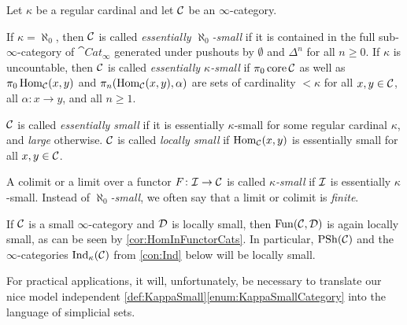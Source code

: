 \begin{defi}\label{def:KappaSmall}
	Let $\kappa$ be a regular cardinal and let $\mathcal{C}$ be an $\infty$-category.
	\begin{alphanumerate}
		\item If $\kappa=\aleph_0$, then $\mathcal{C}$ is called \emph{essentially $\aleph_0$-small} if it is contained in the full sub-$\infty$-category of $\cat{Cat}_\infty$ generated under pushouts by $\emptyset$ and $\Delta^n$ for all $n\geqslant 0$. If $\kappa$ is uncountable, then $\mathcal{C}$ is called \emph{essentially $\kappa$-small} if $\pi_0\operatorname{core} \mathcal{C}$ as well as $\pi_0\operatorname{Hom}_{\mathcal{C}}(x,y)$ and $\pi_n(\operatorname{Hom}_{\mathcal{C}}(x,y),\alpha)$ are sets of cardinality $<\kappa$ for all $x,y\in\mathcal{C}$, all $\alpha\colon x\rightarrow y$, and all $n\geqslant 1$.\label{enum:KappaSmallCategory}%
		\item $\mathcal{C}$ is called \emph{essentially small} if it is essentially $\kappa$-small for some regular cardinal $\kappa$, and \emph{large} otherwise. $\mathcal{C}$ is called \emph{locally small} if $\operatorname{Hom}_{\mathcal{C}}(x,y)$ is essentially small for all $x,y\in\mathcal{C}$.\label{enum:Small}
		\item A colimit or a limit over a functor $F\colon \mathcal{I}\rightarrow \mathcal{C}$ is called \emph{$\kappa$-small} if $\mathcal{I}$ is essentially $\kappa$-small. Instead of \emph{$\aleph_0$-small}, we often say that a limit or colimit is \emph{finite}.\label{enum:KappaSmallLimit}
	\end{alphanumerate}
\end{defi}
\begin{rem}\label{rem:FunLocallySmall}
	If $\mathcal{C}$ is a small $\infty$-category and $\mathcal{D}$ is locally small, then $\operatorname{Fun}(\mathcal{C},\mathcal{D})$ is again locally small, as can be seen by \cref{cor:HomInFunctorCats}. In particular, $\operatorname{PSh}(\mathcal{C})$ and the $\infty$-categories $\mathrm{Ind}_\kappa(\mathcal{C})$ from \cref{con:Ind} below will be locally small.
\end{rem}
For practical applications, it will, unfortunately, be necessary to translate our nice model independent \cref{def:KappaSmall}\cref{enum:KappaSmallCategory} into the language of simplicial sets.
